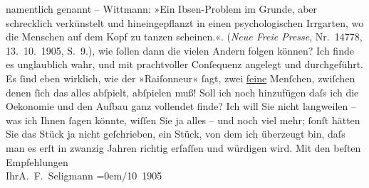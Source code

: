 \begin{ledgroupsized}[t]{13cm}
{{{                        namentlich genannt – Wittmann:
                            »Ein Ibsen-Problem im Grunde,
                            aber schrecklich verkünstelt und hineingepflanzt in einen
                            psychologischen Irrgarten, wo die Menschen auf dem Kopf zu tanzen
                            scheinen.«. (\emph{Neue Freie
                                Presse}, Nr. 14778, 13. 10. 1905,
                            S. 9.)}}}\label{K_L01563_1h}, wie ſollen dann die vielen Andern folgen
                    können? Ich finde es unglaublich wahr, und mit prachtvoller Conſequenz angelegt
                    und durchgeführt. Es ſind eben wirklich, wie der »Raiſonneur« ſagt, zwei \uline{feine} Menſchen, zwiſchen denen ſich das alles
                    abſpielt, abſpielen muß! Soll ich noch hinzufügen daſs ich die Oekonomie und den
                    Aufbau ganz vollendet finde? Ich will Sie nicht langweilen – was ich Ihnen ſagen
                    könnte, wiſſen Sie {\pb}ja alles – und noch viel mehr; ſonſt hätten Sie
                    das Stück ja nicht
                    geſchrieben, ein Stück, von
                    dem ich überzeugt bin, daſs man es erſt in zwanzig Jahren richtig erfaſſen und
                    würdigen wird.\pend
           \pstart
           Mit den beſten Empfehlungen{\\[\baselineskip]}Ihr\spacefill\mbox{A. F. Seligmann}\pend
           \leftskip=0em{}/10 1905\pend
           \endnumbering{}\end{ledgroupsized}  \newcommand{\dateiname}{L01563}\newcommand{\titel}{Adalbert Seligmann an Arthur Schnitzler, 13. 10. 1905}\newcommand{\editorInnen}{Martin Anton Müller und Gerd-Hermann Susen}
            \footnotesize
\begin{ledgroupsized}[t]{11.5cm}
\end{ledgroupsized}
         
      